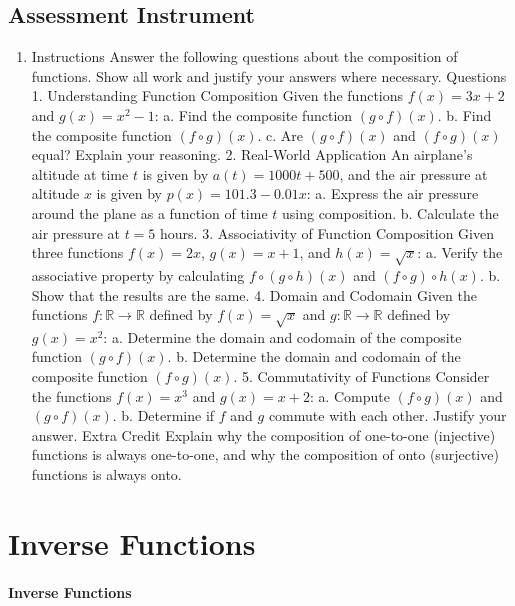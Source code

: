 \subsection{Assessment Instrument}

\begin{enumerate}
    \item Instructions Answer the following questions about the composition of functions. Show all work and justify your answers where necessary. Questions 1. Understanding Function Composition Given the functions $f(x) = 3x + 2$ and $g(x) = x^2 - 1$: a. Find the composite function $(g \circ f)(x)$. b. Find the composite function $(f \circ g)(x)$. c. Are $(g \circ f)(x)$ and $(f \circ g)(x)$ equal? Explain your reasoning. 2. Real-World Application An airplane's altitude at time $t$ is given by $a(t) = 1000t + 500$, and the air pressure at altitude $x$ is given by $p(x) = 101.3 - 0.01x$: a. Express the air pressure around the plane as a function of time $t$ using composition. b. Calculate the air pressure at $t = 5$ hours. 3. Associativity of Function Composition Given three functions $f(x) = 2x$, $g(x) = x + 1$, and $h(x) = \sqrt{x}$: a. Verify the associative property by calculating $f \circ (g \circ h)(x)$ and $(f \circ g) \circ h(x)$. b. Show that the results are the same. 4. Domain and Codomain Given the functions $f : \mathbb{R} \to \mathbb{R}$ defined by $f(x) = \sqrt{x}$ and $g : \mathbb{R} \to \mathbb{R}$ defined by $g(x) = x^2$: a. Determine the domain and codomain of the composite function $(g \circ f)(x)$. b. Determine the domain and codomain of the composite function $(f \circ g)(x)$. 5. Commutativity of Functions Consider the functions $f(x) = x^3$ and $g(x) = x + 2$: a. Compute $(f \circ g)(x)$ and $(g \circ f)(x)$. b. Determine if $f$ and $g$ commute with each other. Justify your answer. Extra Credit Explain why the composition of one-to-one (injective) functions is always one-to-one, and why the composition of onto (surjective) functions is always onto.
\end{enumerate}

\section{Inverse Functions}
\label{sec:inverse-functions}

\paragraph{Inverse Functions}


